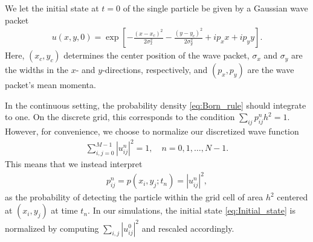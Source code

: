 \documentclass[aps,pra,reprint,amsmath,amssymb,twocolumn,preprintnumbers,superscriptaddress,10pt]{revtex4-2}
\begin{document}
We let the initial state at \(t=0\) of the single particle be given by a Gaussian wave packet
\begin{align}
    u(x,y,0) = \exp[-\frac{(x-x_c)^2}{2\sigma_x^2} - \frac{(y-y_c)^2}{2\sigma_y^2} + ip_x x + ip_y y].    \label{eq:Initial_state}
\end{align}
Here, \((x_c, y_c)\) determines the center position of the wave packet, \(\sigma_x\) and \(\sigma_y\) are the widths in the \(x\)- and \(y\)-directions, respectively, and \((p_x, p_y)\) are the wave packet's mean momenta.


In the continuous setting, the probability density \eqref{eq:Born_rule} should integrate to one. 
On the discrete grid, this corresponds to the condition \({\sum_{ij}p^n_{ij} h^2 = 1}\).
However, for convenience, we choose to normalize our discretized wave function
\begin{align}
    \sum_{i,j=0}^{M-1} |u^n_{ij}|^2 = 1, \quad n=0,1, \ldots, N-1.
\end{align}
This means that we instead interpret 
\begin{align}
    p^n_{ij} = p(x_i, y_j; t_n) = |u^n_{ij}|^2,
\end{align} 
as the probability of detecting the particle within the grid cell of area \(h^2\) centered at 
\((x_i, y_j)\) at time \(t_n\).  
In our simulations, the initial state \eqref{eq:Initial_state} is normalized by computing
\(\sum_{i,j} |u_{ij}^0|^2\) and rescaled accordingly.
\end{document}

